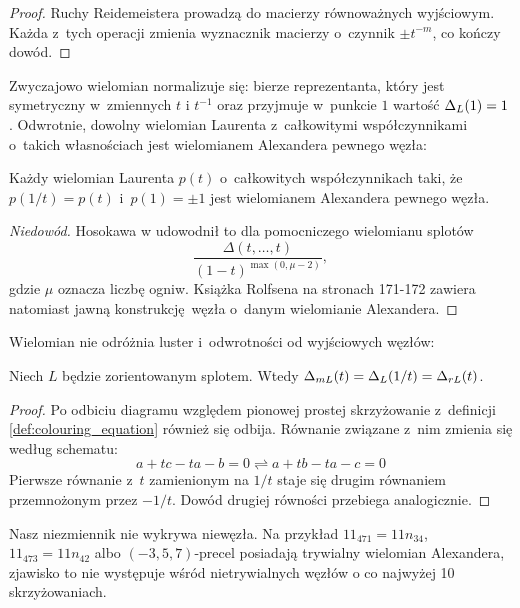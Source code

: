 \begin{proof}
    Ruchy Reidemeistera prowadzą do macierzy równoważnych wyjściowym.
    Każda z~tych operacji zmienia wyznacznik macierzy o~czynnik $\pm t^{-m}$, co kończy dowód.
\end{proof}

Zwyczajowo wielomian normalizuje się: bierze reprezentanta, który jest symetryczny w~zmiennych $t$ i $t^{-1}$ oraz przyjmuje w~punkcie $1$ wartość $\Delta_L(1) = 1$.
Odwrotnie, dowolny wielomian Laurenta z~całkowitymi współczynnikami o~takich własnościach jest wielomianem Alexandera pewnego węzła:

\begin{proposition}
    Każdy wielomian Laurenta $p(t)$ o~całkowitych współczynnikach taki, że $p(1/t) = p(t)$ i~$p(1) = \pm 1$ jest wielomianem Alexandera pewnego węzła.
\end{proposition}

\begin{proof}[Niedowód]
    Hosokawa w \cite{hosokawa58} udowodnił to dla pomocniczego wielomianu splotów
    \begin{equation}
        \frac{\Delta(t, \ldots, t)}{(1-t)^{\max(0, \mu - 2)}},
    \end{equation}
    gdzie $\mu$ oznacza liczbę ogniw.
    Książka \cite{rolfsen76} Rolfsena na stronach 171-172 zawiera natomiast jawną konstrukcję węzła o~danym wielomianie Alexandera.
\end{proof}

Wielomian nie odróżnia luster i~odwrotności od wyjściowych węzłów:

\begin{proposition}

    Niech $L$ będzie zorientowanym splotem.
    Wtedy $\Delta_{mL}(t) = \Delta_L(1/t) = \Delta_{rL}(t)$.
\end{proposition}

\begin{proof}
    Po odbiciu diagramu względem pionowej prostej skrzyżowanie z~definicji \ref{def:colouring_equation} również się odbija.
    Równanie związane z~nim zmienia się według schematu:
    \begin{equation}
        a + tc - ta - b = 0 \rightleftharpoons a + tb - ta - c = 0
    \end{equation}
    Pierwsze równanie z~$t$ zamienionym na $1/t$ staje się drugim równaniem przemnożonym przez $-1/t$.
    Dowód drugiej równości przebiega analogicznie.
\end{proof}

Nasz niezmiennik nie wykrywa niewęzła.
Na przykład $11_{471} = 11n_{34}$, $11_{473} = 11n_{42}$ albo $(-3, 5, 7)$-precel posiadają trywialny wielomian Alexandera, zjawisko to nie występuje wśród nietrywialnych węzłów o co najwyżej 10 skrzyżowaniach.

